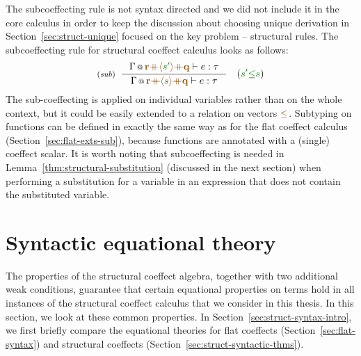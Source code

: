 The subcoeffecting rule is not syntax directed and we did not include it in the core calculus
in order to keep the discussion about choosing unique derivation in Section~\ref{sec:struct-unique}
focused on the key problem -- structural rules. The subcoeffecting rule for structural coeffect
calculus looks as follows:
%
\begin{equation*}
\tyrule{sub}
  {\coctx{\Gamma}{\aclrd{\textbf{r}} \atimes \alift{\cclrd{s'}} \atimes \aclrd{\textbf{q}}} \vdash e : \tau}
  {\coctx{\Gamma}{\aclrd{\textbf{r}} \atimes \alift{\cclrd{s}} \atimes \aclrd{\textbf{q}}} \vdash e : \tau}
\quad
(\cclrd{s'} \cleq \cclrd{s})
\end{equation*}
%
The sub-coeffecting is applied on individual variables rather than on the whole context, but it
could be easily extended to a relation on vectors $\aclrd{\leq}$. Subtyping on functions can be
defined in exactly the same way as for the flat coeffect calculus (Section~\ref{sec:flat-exts-sub}),
because functions are annotated with a (single) coeffect scalar. It is worth noting that
subcoeffecting is needed in Lemma~\ref{thm:structural-substitution} (discussed in the next
section) when performing a substitution for a variable in an expression that does not contain the
substituted variable.



%
%

\section{Syntactic equational theory}
\label{sec:struct-syntax}

The properties of the structural coeffect algebra, together with two additional weak conditions,
guarantee that certain equational properties on terms hold in all instances of the structural
coeffect calculus that we consider in this thesis. In this section, we look at these common
properties. In Section~\ref{sec:struct-syntax-intro}, we first briefly compare the equational theories
for flat coeffects (Section~\ref{sec:flat-syntax}) and structural coeffects (Section~\ref{sec:struct-syntactic-thms}).

